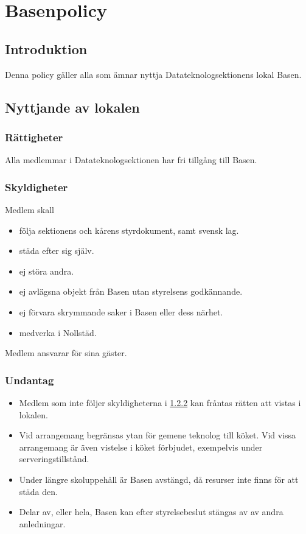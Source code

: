 \section{Basenpolicy}
\subsection{Introduktion}
Denna policy gäller alla som ämnar nyttja Datateknologsektionens lokal Basen.
\subsection{Nyttjande av lokalen}
\subsubsection{Rättigheter}
Alla medlemmar i Datateknologsektionen har fri tillgång till Basen. 

\subsubsection{Skyldigheter}
\label{sec:basen:skyldigheter}
Medlem skall
\begin{itemize}
    \item följa sektionens och kårens styrdokument, samt svensk lag.
    \item städa efter sig själv.
    \item ej störa andra.
    \item ej avlägsna objekt från Basen utan styrelsens godkännande.
    \item ej förvara skrymmande saker i Basen eller dess närhet.
    \item medverka i Nollstäd.
\end{itemize}
Medlem ansvarar för sina gäster.

\subsubsection{Undantag}
\begin{itemize}
    \item Medlem som inte följer skyldigheterna i \ref{sec:basen:skyldigheter} kan fråntas rätten att vistas i lokalen.
    \item Vid arrangemang begränsas ytan för gemene teknolog till köket. Vid vissa arrangemang är även vistelse i köket förbjudet, exempelvis under serveringstillstånd.
    \item Under längre skoluppehåll är Basen avstängd, då resurser inte finns för att städa den.
    \item Delar av, eller hela, Basen kan efter styrelsebeslut stängas av av andra anledningar.
\end{itemize}

